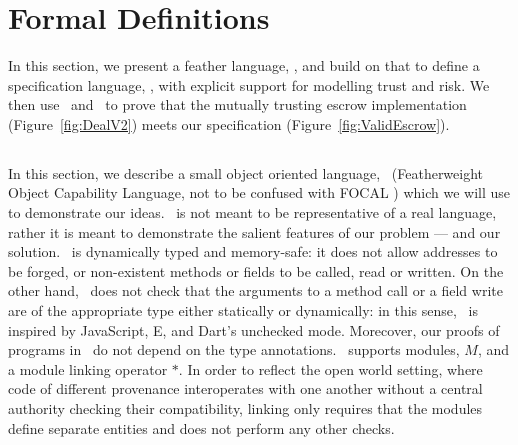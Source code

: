 \section{Formal Definitions}

In this section, we present a feather language, \LangOO, and build on that to
define a specification language, \Chainmail, with explicit support
for modelling trust and risk. We then use \LangOO\ and \Chainmail\ to
prove that the mutually trusting escrow implementation
(Figure~\ref{fig:DealV2}) meets our specification (Figure~\ref{fig:ValidEscrow}).
%

\subsection{\LangOO}
\label{sec:Lan}

In this section, we describe a small object oriented language,
\LangOO\  (Featherweight Object Capability Language, not to be confused
with FOCAL \cite{FOCAL-69}) which we will use to demonstrate our ideas. \LangOO\ is not
meant to be representative of a real language, rather it is meant to
demonstrate the salient features of our problem --- and our solution.
%
\LangOO\ is dynamically typed and memory-safe: it does not allow
addresses to be forged, or non-existent methods or fields to be
called, read or written. On the other hand, \LangOO\ does not check
that the arguments to a method call or a field write are of the
appropriate type either statically or dynamically: in this sense,
\LangOO\ is inspired by JavaScript, E, and Dart's unchecked mode.
Morecover, our proofs
of programs in \LangOO\ do not depend on the type annotations.
%
\LangOO\  supports modules, $M$,
and a module linking operator $*$. In order to reflect the open world setting,
where code of different provenance interoperates with one another without a central
authority checking their compatibility,
linking only requires that the modules define separate entities and
does not perform any other checks.
%



